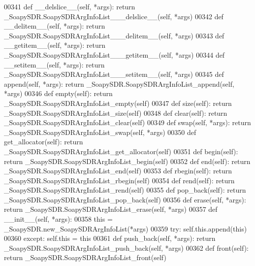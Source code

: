 \begin{DoxyCode}
{{{{00341     \textcolor{keyword}{def }__delslice__(self, *args): \textcolor{keywordflow}{return} \_SoapySDR.SoapySDRArgInfoList\_\_\_delslice\_\_(self, *args)
00342     \textcolor{keyword}{def }__delitem__(self, *args): \textcolor{keywordflow}{return} \_SoapySDR.SoapySDRArgInfoList\_\_\_delitem\_\_(self, *args)
00343     \textcolor{keyword}{def }__getitem__(self, *args): \textcolor{keywordflow}{return} \_SoapySDR.SoapySDRArgInfoList\_\_\_getitem\_\_(self, *args)
00344     \textcolor{keyword}{def }__setitem__(self, *args): \textcolor{keywordflow}{return} \_SoapySDR.SoapySDRArgInfoList\_\_\_setitem\_\_(self, *args)
00345     \textcolor{keyword}{def }append(self, *args): \textcolor{keywordflow}{return} \_SoapySDR.SoapySDRArgInfoList\_append(self, *args)
00346     \textcolor{keyword}{def }empty(self): \textcolor{keywordflow}{return} \_SoapySDR.SoapySDRArgInfoList\_empty(self)
00347     \textcolor{keyword}{def }size(self): \textcolor{keywordflow}{return} \_SoapySDR.SoapySDRArgInfoList\_size(self)
00348     \textcolor{keyword}{def }clear(self): \textcolor{keywordflow}{return} \_SoapySDR.SoapySDRArgInfoList_clear(self)
00349     \textcolor{keyword}{def }swap(self, *args): \textcolor{keywordflow}{return} \_SoapySDR.SoapySDRArgInfoList\_swap(self, *args)
00350     \textcolor{keyword}{def }get_allocator(self): \textcolor{keywordflow}{return} \_SoapySDR.SoapySDRArgInfoList\_get\_allocator(self)
00351     \textcolor{keyword}{def }begin(self): \textcolor{keywordflow}{return} \_SoapySDR.SoapySDRArgInfoList\_begin(self)
00352     \textcolor{keyword}{def }end(self): \textcolor{keywordflow}{return} \_SoapySDR.SoapySDRArgInfoList\_end(self)
00353     \textcolor{keyword}{def }rbegin(self): \textcolor{keywordflow}{return} \_SoapySDR.SoapySDRArgInfoList\_rbegin(self)
00354     \textcolor{keyword}{def }rend(self): \textcolor{keywordflow}{return} \_SoapySDR.SoapySDRArgInfoList\_rend(self)
00355     \textcolor{keyword}{def }pop_back(self): \textcolor{keywordflow}{return} \_SoapySDR.SoapySDRArgInfoList\_pop\_back(self)
00356     \textcolor{keyword}{def }erase(self, *args): \textcolor{keywordflow}{return} \_SoapySDR.SoapySDRArgInfoList\_erase(self, *args)
00357     \textcolor{keyword}{def }__init__(self, *args): 
00358         this = \_SoapySDR.new\_SoapySDRArgInfoList(*args)
00359         \textcolor{keywordflow}{try}: self.this.append(this)
00360         \textcolor{keywordflow}{except}: self.this = this
00361     \textcolor{keyword}{def }push_back(self, *args): \textcolor{keywordflow}{return} \_SoapySDR.SoapySDRArgInfoList\_push\_back(self, *args)
00362     \textcolor{keyword}{def }front(self): \textcolor{keywordflow}{return} \_SoapySDR.SoapySDRArgInfoList\_front(self)
}}}}
\end{DoxyCode}
